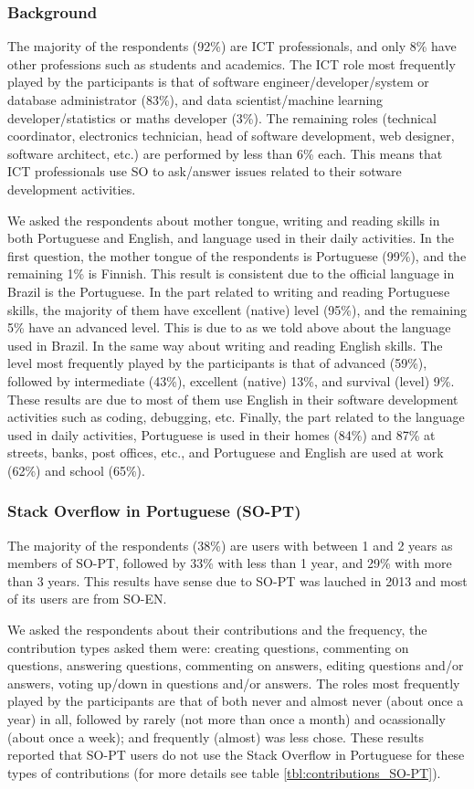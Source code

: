 \subsubsection{Background}
The majority of the respondents (92\%) are ICT professionals, and only 8\% have other professions such as students and academics. The ICT role most frequently played by the participants is that of software engineer/developer/system or database administrator (83\%), and data scientist/machine learning developer/statistics or maths developer (3\%). The remaining roles (technical coordinator, electronics technician, head of software development, web designer, software architect, etc.) are performed by less than 6\% each. This means that ICT professionals use SO to ask/answer issues related to their sotware development activities.

We asked the respondents about mother tongue, writing and reading skills in both Portuguese and English, and language used in their daily activities. In the first question, the mother tongue of the respondents is Portuguese (99\%), and the remaining 1\% is Finnish. This result is consistent due to the official language in Brazil is the Portuguese. In the part related to writing and reading Portuguese skills, the majority of them have excellent (native) level (95\%), and the remaining 5\% have an advanced level. This is due to as we told above about the language used in Brazil. In the same way about writing and reading English skills. The level most frequently played by the participants is that of advanced (59\%), followed by intermediate (43\%), excellent (native) 13\%, and survival (level) 9\%. These results are due to most of them use English in their software development activities such as coding, debugging, etc. Finally, the part related to the language used in daily activities, Portuguese is used in their homes (84\%) and 87\% at streets, banks, post offices, etc., and Portuguese and English are used at work (62\%) and school (65\%). 

\subsubsection{Stack Overflow in Portuguese (SO-PT)}
The majority of the respondents (38\%) are users with between 1 and 2 years as members of SO-PT, followed by 33\% with less than 1 year, and 29\% with more than 3 years. This results have sense due to SO-PT was lauched in 2013 and most of its users are from SO-EN.
  
We asked the respondents about their contributions and the frequency, the contribution types asked them were: creating questions, commenting on questions, answering questions, commenting on answers, editing questions and/or answers, voting up/down in questions and/or answers. The roles most frequently played by the participants are that of both never and almost never (about once a year) in all, followed by rarely (not more than once a month) and ocassionally (about once a week); and frequently (almost) was less chose. These results reported that SO-PT users do not use the Stack Overflow in Portuguese for these types of contributions (for more details see table \ref{tbl:contributions_SO-PT}). 

